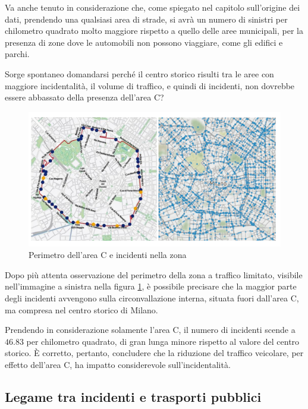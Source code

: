 \documentclass[a4paper]{report}
\begin{document}
Va anche tenuto in considerazione che, come spiegato nel capitolo sull'origine dei dati, 
prendendo una qualsiasi area di strade, si avrà un numero di sinistri per chilometro quadrato 
molto maggiore rispetto a quello delle aree municipali, per la presenza di zone dove  
le automobili non possono viaggiare, come gli edifici e parchi. 

Sorge spontaneo domandarsi perché il centro storico risulti tra le aree con maggiore 
incidentalità, il volume di traffico, e quindi di incidenti, non dovrebbe essere abbassato 
della presenza dell'area C?

\begin{figure}
    \includegraphics[width=\linewidth]{../src/area_c/area_c_incidenti.png}
    \caption{Perimetro dell'area C e incidenti nella zona}
    \label{fig:perimetro-area-c}
\end{figure}

Dopo più attenta osservazione del perimetro della zona a traffico limitato, 
visibile nell'immagine a sinistra nella 
figura \ref{fig:perimetro-area-c}, è possibile precisare che la maggior parte degli 
incidenti avvengono sulla circonvallazione interna, 
situata fuori dall'area C, ma compresa nel centro storico di Milano. 

Prendendo in considerazione solamente l'area C, il numero di incidenti scende a $46.83$ 
per chilometro quadrato, di gran lunga minore rispetto al valore del centro storico. 
\`E corretto, pertanto, concludere che la riduzione del traffico veicolare, per effetto 
dell'area C, ha impatto considerevole sull'incidentalità. 


\subsection{Legame tra incidenti e trasporti pubblici}
\end{document}
